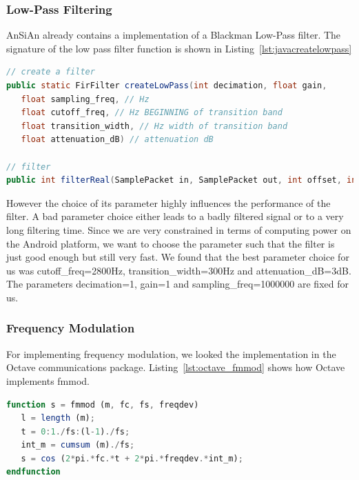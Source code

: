 \subsubsection{Low-Pass Filtering}

AnSiAn already contains a implementation of a Blackman Low-Pass filter. The signature of the low pass filter function is shown in Listing~\ref{lst:javacreatelowpass}

\begin{lstlisting}[label=lst:javacreatelowpass, caption=AnSiAn Blackman Low-Pass Filter, language=java]
// create a filter 
public static FirFilter createLowPass(int decimation, float gain, 
   float sampling_freq, // Hz
   float cutoff_freq, // Hz BEGINNING of transition band
   float transition_width, // Hz width of transition band
   float attenuation_dB) // attenuation dB
   
// filter 
public int filterReal(SamplePacket in, SamplePacket out, int offset, int length)    

\end{lstlisting}
However the choice of its parameter highly influences the performance of the filter. A bad parameter choice either leads to a badly filtered signal or to a very long filtering time. Since we are very constrained in terms of computing power on the Android platform, we want to choose the parameter such that the filter is just good enough but still very fast. 
We found that the best parameter choice for us was cutoff\_freq=2800Hz, transition\_width=300Hz and attenuation\_dB=3dB. \\
The parameters decimation=1, gain=1 and sampling\_freq=1000000 are fixed for us. 

\subsubsection{Frequency Modulation}

For implementing frequency modulation, we looked the implementation in the Octave communications package. Listing~\ref{lst:octave_fmmod} shows how Octave implements fmmod. 
\lstset{numbers=left}
\lstset{stepnumber=1}
\begin{lstlisting}[label=lst:octave_fmmod, caption=Octave implementation of Frequency modulation \cite{octavefmmod}, language=octave,]
function s = fmmod (m, fc, fs, freqdev)
   l = length (m);
   t = 0:1./fs:(l-1)./fs;
   int_m = cumsum (m)./fs;
   s = cos (2*pi.*fc.*t + 2*pi.*freqdev.*int_m);
endfunction
\end{lstlisting}

